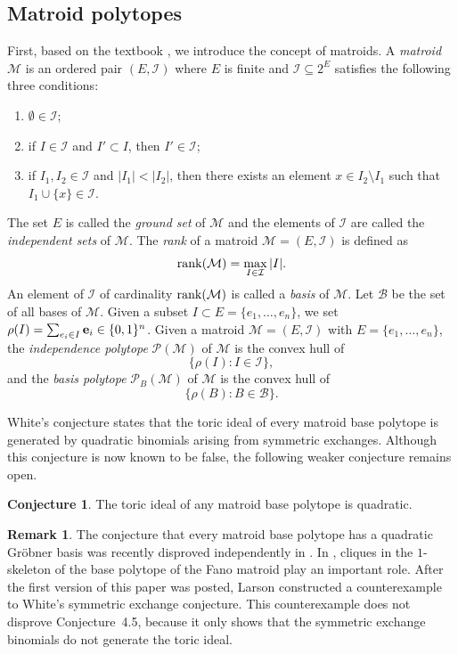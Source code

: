 \documentclass[12pt]{amsart}
\theoremstyle{definition}
\newtheorem{conjecture}[thm]{Conjecture}
\newtheorem{Remark}[thm]{Remark}
\numberwithin{thm}{section}
\numberwithin{equation}{section}
\begin{document}
\subsection{Matroid polytopes}

First, based on the textbook \cite{Oxley}, we introduce the concept of matroids.
A \emph{matroid} $\mathcal{M}$ is an ordered pair $(E,\mathcal{I})$ where $E$ is finite and $\mathcal{I} \subseteq 2^E$ satisfies the following three conditions:
\begin{enumerate}
    \item $\emptyset \in \mathcal{I}$;
    \item if $I \in \mathcal{I}$ and $I' \subset I$, then $I' \in \mathcal{I}$;
    \item if $I_1, I_2 \in \mathcal{I}$ and $|I_1| < |I_2|$, then there exists an element $x \in I_2 \setminus I_1$ such that $I_1 \cup \{x \}\in \mathcal{I}$.
\end{enumerate}
The set $E$ is called the \emph{ground set} of $\mathcal{M}$ and the elements of $\mathcal{I}$ are called the \emph{independent sets} of $\mathcal{M}$.
The \emph{rank} of a matroid $\mathcal{M} = (E,\mathcal{I})$ is defined as 
\[
    {\rm rank} (\mathcal{M}) = \max_{I \in \mathcal{I}} |I|.
\]
An element of $\mathcal{I}$ of cardinality ${\rm rank} (\mathcal{M})$ is called a \emph{basis} of $\mathcal{M}$.
Let ${\mathcal B}$ be the set of all bases of ${\mathcal M}$.
Given a subset $ I \subset E=\{e_1,\dots,e_n\}$, 
we set $\rho(I) = \sum_{e_i \in I} {\bf e}_i \in \{0,1\}^n$.
Given a matroid $\mathcal{M}=(E,\mathcal{I})$ with $E=\{e_1,\ldots,e_n\}$,
the {\em independence polytope} ${\mathcal P}({\mathcal M})$ of ${\mathcal M}$ is the convex hull of
$$
\{ \rho (I) : I \in {\mathcal I}\},
$$
and the {\em basis polytope} ${\mathcal P}_{B} ({\mathcal M})$ of ${\mathcal M}$ is the convex hull of
$$
\{ \rho (B) : B \in {\mathcal B}\}.
$$


White's conjecture \cite{WC} states that the toric ideal of every matroid base polytope is generated by quadratic binomials arising from symmetric exchanges. Although this conjecture is now known to be false, the following weaker conjecture remains open.

\begin{conjecture}\label{Mconj}
The toric ideal of any matroid base polytope is quadratic.
\end{conjecture}

\begin{Remark} The conjecture that every matroid base polytope has a quadratic Gr\"obner basis was recently disproved independently in \cite{Tsuika, DFMR}. In \cite{DFMR}, cliques in the \(1\)-skeleton of the base polytope of the Fano matroid play an important role. After the first version of this paper was posted, Larson \cite{Las} constructed a counterexample to White's symmetric exchange conjecture. This counterexample does not disprove Conjecture~4.5, because it only shows that the symmetric exchange binomials do not generate the toric ideal. 
\end{Remark}
\end{document}
